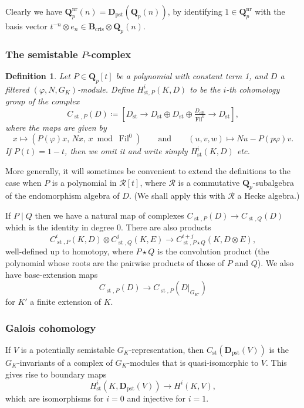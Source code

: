 \documentclass[cjm]{ipart}
\theoremstyle{plain}
\newtheorem{definition}[theorem]{Definition}
\theoremstyle{remark}
\DeclareMathOperator{\Fil}{Fil}
\DeclareMathOperator{\st}{st}
\newcommand{\Dpst}{\mathbf{D}_{\mathrm{pst}}}
\newcommand{\QQ}{\mathbf{Q}}
\newcommand{\Qp}{\QQ_p}
\newcommand{\dR}{\mathrm{dR}}
\numberwithin{equation}{subsection}
\begin{document}
   Clearly we have $\Qp^{\mathrm{nr}}(n) = \Dpst(\Qp(n))$, by identifying $1 \in \Qp^{\mathrm{nr}}$ with the basis vector $t^{-n} \otimes e_n \in \mathbf{B}_{\mathrm{cris}} \otimes \Qp(n)$.


  \subsubsection*{The semistable $P$-complex}

   \begin{definition}
    Let $P \in \Qp[t]$ be a polynomial with constant term 1, and $D$ a filtered $(\varphi, N, G_K)$-module. Define $H^i_{\mathrm{st}, P}(K, D)$ to be the $i$-th cohomology group of the complex
    \[
     C_{\st, P}(D) \coloneqq \left[ D_{\st} \longrightarrow  D_{\st}\oplus D_{\st}\oplus \tfrac{D_{\dR}}{\Fil^0} \longrightarrow D_{\st}\right],
    \]
    where the maps are given by
    \[
     x \mapsto \left( P(\varphi)x,\, Nx,\, x \bmod \Fil^0 \right)\qquad \text{and}\qquad (u,v,w)\mapsto Nu-P(p\varphi)v.
    \]
    If $P(t) = 1 - t$, then we omit it and write simply $H^i_{\st}(K, D)$ etc.
   \end{definition}

   \begin{note}
    More generally, it will sometimes be convenient to extend the definitions to the case when $P$ is a polynomial in $\mathcal{R}[t]$, where $\mathcal{R}$ is a commutative $\Qp$-subalgebra of the endomorphism algebra of $D$. (We shall apply this with $\mathcal{R}$ a Hecke algebra.)
   \end{note}

   If $P \mid Q$ then we have a natural map of complexes $C_{\st, P}(D) \to C_{\st, Q}(D)$ which is the identity in degree 0. There are also products
   \[ C^i_{\st, P}(K, D) \otimes C^j_{\st, Q}(K, E)
   \to C^{i+j}_{\st, P\star Q}(K, D \otimes E),\]
   well-defined up to homotopy, where $P \star Q$ is the convolution product (the polynomial whose roots are the pairwise products of those of $P$ and $Q$). We also have base-extension maps
   \[ C_{\st, P}(D) \to C_{\st, P}\left(D|_{G_{K'}}\right)\]
   for $K'$ a finite extension of $K$.

  \subsubsection*{Galois cohomology}

   If $V$ is a potentially semistable $G_K$-representation, then $C_{\st}(\Dpst(V))$ is the $G_K$-invariants of a complex of $G_K$-modules that is quasi-isomorphic to $V$. This gives rise to boundary maps
   \begin{equation}
    \label{eq:genexpmap}
    H^i_{\st}(K, \Dpst(V)) \to H^i(K, V),
   \end{equation}
   which are isomorphisms for $i = 0$ and injective for $i = 1$.
\end{document}
